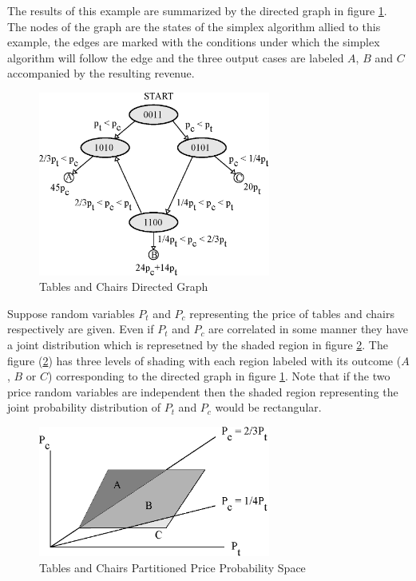 The results of this example are summarized by the directed graph in figure \ref{fig:tc_directed_graph}. The nodes of the graph are the states of the simplex algorithm allied to this example, the edges are marked with the conditions under which the simplex algorithm will follow the edge and the three output cases are labeled $A$, $B$ and $C$ accompanied by the resulting revenue.

\begin{figure}
  \centering
  \includegraphics[width=3in]{Images/tc_directed_graph}
  \caption[Tables and Chairs Directed Graph]
          {Tables and Chairs Directed Graph}
  \label{fig:tc_directed_graph}
\end{figure}

Suppose random variables $P_t$ and $P_c$ representing the price of tables and chairs respectively are given. Even if $P_t$ and $P_c$ are correlated in some manner they have a joint distribution which is represetned by the shaded region in figure \ref{fig:tc_joint_prices}. The figure (\ref{fig:tc_joint_prices}) has three levels of shading with each region labeled with its outcome ($A$, $B$ or $C$) corresponding to the directed graph in figure \ref{fig:tc_directed_graph}. Note that if the two price random variables are independent then the shaded region representing the joint probability distribution of $P_t$ and $P_c$ would be rectangular. 

\begin{figure}
  \centering
  \includegraphics[width=3in]{Images/tc_joint_prices}
  \caption[Tables and Chairs Partitioned Price Probability Space]
          {Tables and Chairs Partitioned Price Probability Space}
  \label{fig:tc_joint_prices}
\end{figure}

